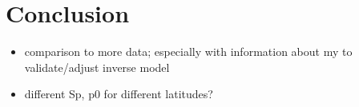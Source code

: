 \documentclass[11pt, a4paper]{article}
\begin{document}

\clearpage
\section{Conclusion}

\begin{itemize}
\item comparison to more data; especially with information about my to validate/adjust inverse model
\item different Sp, p0 for different latitudes? %
\end{itemize}
\end{document}
